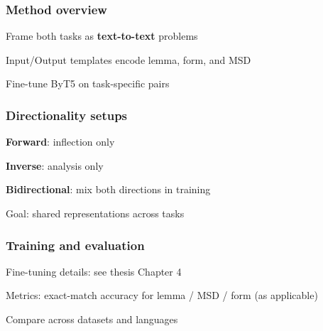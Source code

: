 
\begin{frame}
    \frametitle{Method overview}
    \begin{PraesentationAufzaehlung}
        \item Frame both tasks as \textbf{text-to-text} problems
        \item Input/Output templates encode lemma, form, and MSD
        \item Fine-tune ByT5 on task-specific pairs
    \end{PraesentationAufzaehlung}
\end{frame}

\begin{frame}
    \frametitle{Directionality setups}
    \begin{PraesentationAufzaehlung}
        \item \textbf{Forward}: inflection only
        \item \textbf{Inverse}: analysis only
        \item \textbf{Bidirectional}: mix both directions in training
        \item Goal: shared representations across tasks
    \end{PraesentationAufzaehlung}
\end{frame}

\begin{frame}
    \frametitle{Training and evaluation}
    \begin{PraesentationAufzaehlung}
        \item Fine-tuning details: see thesis Chapter 4
        \item Metrics: exact-match accuracy for lemma / MSD / form (as applicable)
        \item Compare across datasets and languages
    \end{PraesentationAufzaehlung}
\end{frame}
